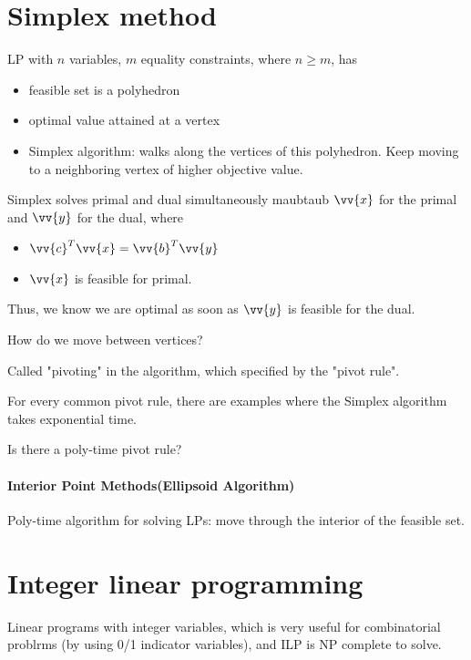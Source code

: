 \section{Simplex method}

LP with \(n\) variables, \(m\) equality constraints, where \(n \ge m\), has
\begin{itemize}
    \item feasible set is a polyhedron 
    \item optimal value attained at a vertex
    \item Simplex algorithm: walks along the vertices of this polyhedron. Keep moving to a neighboring vertex of higher objective value.
\end{itemize}   

Simplex solves primal and dual simultaneously maubtaub \(\vv{x}\) for the primal and \(\vv{y}\) for the dual, where
\begin{itemize}
    \item \(\vv{c}^T \vv{x} = \vv{b}^T \vv{y}\)
    \item \(\vv{x}\) is feasible for primal.  
\end{itemize} 

Thus, we know we are optimal as soon as \(\vv{y}\) is feasible for the dual. 

\begin{question}
    How do we move between vertices?
\end{question}
\begin{answer}
    Called "pivoting" in the algorithm, which specified by the "pivot rule".
\end{answer}

For every common pivot rule, there are examples where the Simplex algorithm takes exponential time. 

\begin{question}
    Is there a poly-time pivot rule?
\end{question}


\paragraph{Interior Point Methods(Ellipsoid Algorithm)}
Poly-time algorithm for solving LPs: move through the interior of the feasible set.

\section{Integer linear programming}
Linear programs with integer variables, which is very useful for combinatorial problrms (by using 0/1 indicator variables), and ILP is NP complete to solve.


